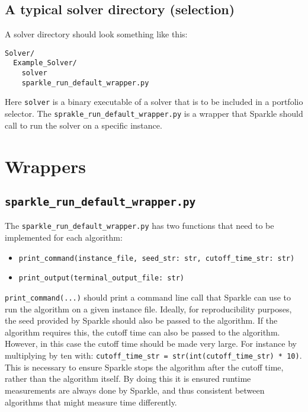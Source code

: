 \documentclass{article}
\begin{document}
\subsection{A typical solver directory (selection)}
\label{dir:solvers_selection}

A solver directory should look something like this:

\begin{verbatim}
Solver/
  Example_Solver/
    solver
    sparkle_run_default_wrapper.py
\end{verbatim}

Here \texttt{solver} is a binary executable of a solver that is to be included in a portfolio selector. The \texttt{sprakle\_run\_default\_wrapper.py} is a wrapper that Sparkle should call to run the solver on a specific instance.

\section{Wrappers}

\subsection{\texttt{sparkle\_run\_default\_wrapper.py}}
The \texttt{sparkle\_run\_default\_wrapper.py} has two functions that need to be implemented for each algorithm:

\begin{itemize}[noitemsep]
  \item \texttt{print\_command(instance\_file, seed\_str: str, cutoff\_time\_str: str)}
  \item \texttt{print\_output(terminal\_output\_file: str)}
\end{itemize}

\texttt{print\_command(...)} should print a command line call that Sparkle can use to run the algorithm on a given instance file. Ideally, for reproducibility purposes, the seed provided by Sparkle should also be passed to the algorithm. If the algorithm requires this, the cutoff time can also be passed to the algorithm. However, in this case the cutoff time should be made very large. For instance by multiplying by ten with: \texttt{cutoff\_time\_str = str(int(cutoff\_time\_str) * 10)}. This is necessary to ensure Sparkle stops the algorithm after the cutoff time, rather than the algorithm itself. By doing this it is ensured runtime measurements are always done by Sparkle, and thus consistent between algorithms that might measure time differently.
\end{document}
